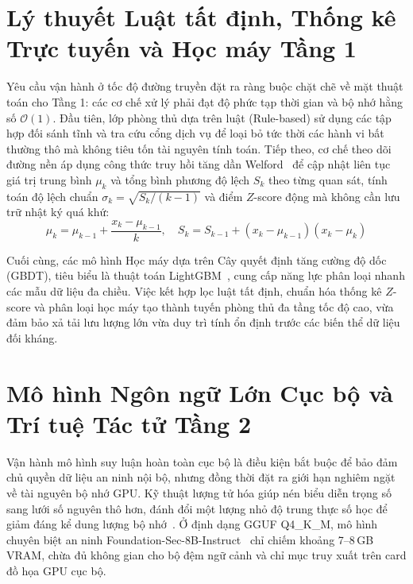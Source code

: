 \section{Lý thuyết Luật tất định, Thống kê Trực tuyến và Học máy Tầng 1}
\label{sec:welford}

Yêu cầu vận hành ở tốc độ đường truyền đặt ra ràng buộc chặt chẽ về mặt thuật toán cho Tầng 1: các cơ chế xử lý phải đạt độ phức tạp thời gian và bộ nhớ hằng số $\mathcal{O}(1)$. Đầu tiên, lớp phòng thủ dựa trên luật (Rule-based) sử dụng các tập hợp đối sánh tĩnh và tra cứu cổng dịch vụ để loại bỏ tức thời các hành vi bất thường thô mà không tiêu tốn tài nguyên tính toán. Tiếp theo, cơ chế theo dõi đường nền áp dụng công thức truy hồi tăng dần Welford~\cite{welford1962} để cập nhật liên tục giá trị trung bình $\mu_k$ và tổng bình phương độ lệch $S_k$ theo từng quan sát, tính toán độ lệch chuẩn $\sigma_k = \sqrt{S_k / (k-1)}$ và điểm $Z$-score động mà không cần lưu trữ nhật ký quá khứ:
\begin{equation}
\label{eq:welford}
    \mu_k = \mu_{k-1} + \frac{x_k - \mu_{k-1}}{k}, \quad S_k = S_{k-1} + (x_k - \mu_{k-1})(x_k - \mu_k)
\end{equation}

Cuối cùng, các mô hình Học máy dựa trên Cây quyết định tăng cường độ dốc (GBDT), tiêu biểu là thuật toán LightGBM~\cite{ke2017lightgbm}, cung cấp năng lực phân loại nhanh các mẫu dữ liệu đa chiều. Việc kết hợp lọc luật tất định, chuẩn hóa thống kê $Z$-score và phân loại học máy tạo thành tuyến phòng thủ đa tầng tốc độ cao, vừa đảm bảo xả tải lưu lượng lớn vừa duy trì tính ổn định trước các biến thể dữ liệu đối kháng.

\section{Mô hình Ngôn ngữ Lớn Cục bộ và Trí tuệ Tác tử Tầng 2}
\label{sec:local_llm}

Vận hành mô hình suy luận hoàn toàn cục bộ là điều kiện bắt buộc để bảo đảm chủ quyền dữ liệu an ninh nội bộ, nhưng đồng thời đặt ra giới hạn nghiêm ngặt về tài nguyên bộ nhớ GPU. Kỹ thuật lượng tử hóa giúp nén biểu diễn trọng số sang lưới số nguyên thô hơn, đánh đổi một lượng nhỏ độ trung thực số học để giảm đáng kể dung lượng bộ nhớ~\cite{quantization2021}. Ở định dạng GGUF Q4\_K\_M, mô hình chuyên biệt an ninh Foundation-Sec-8B-Instruct~\cite{foundation_sec_instruct, foundation_sec_2024} chỉ chiếm khoảng 7–8\,GB VRAM, chừa đủ không gian cho bộ đệm ngữ cảnh và chỉ mục truy xuất trên card đồ họa GPU cục bộ.

